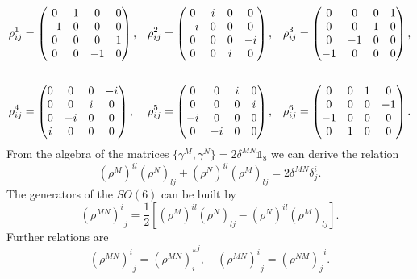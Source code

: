 \begin{align}
\rho^{1}_{ij} &= \begin{pmatrix}
0 & 1 & 0 & 0 \\ 
-1 & 0 & 0 & 0 \\ 
0 & 0 & 0 & 1 \\ 
0 & 0 & -1 & 0
\end{pmatrix} , &
%
\rho^{2}_{ij} &= \begin{pmatrix}
0 & i & 0 & 0 \\ 
-i & 0 & 0 & 0 \\ 
0 & 0 & 0 & -i \\ 
0 & 0 & i & 0
\end{pmatrix} , &
%
\rho^{3}_{ij} &= \begin{pmatrix}
0 & 0 & 0 & 1 \\ 
0 & 0 & 1 & 0 \\ 
0 & -1 & 0 & 0 \\ 
-1 & 0 & 0 & 0
\end{pmatrix} , \notag\\[0.6cm]
%
%
%
\rho^{4}_{ij} &= \begin{pmatrix}
0 & 0 & 0 & -i \\ 
0 & 0 & i & 0 \\ 
0 & -i & 0 & 0 \\ 
i & 0 & 0 & 0
\end{pmatrix} , &
%
\rho^{5}_{ij} &= \begin{pmatrix}
0 & 0 & i & 0 \\ 
0 & 0 & 0 & i \\ 
-i & 0 & 0 & 0 \\ 
0 & -i & 0 & 0
\end{pmatrix} , &
%
\rho^{6}_{ij} &= \begin{pmatrix}
0 & 0 & 1 & 0 \\ 
0 & 0 & 0 & -1 \\ 
-1 & 0 & 0 & 0 \\ 
0 & 1 & 0 & 0
\end{pmatrix} . \raisetag{-6pt}
\end{align}
%
%
From the  algebra of the  matrices $\lbrace \gamma^{M}, \gamma^{N}\rbrace = 2\delta^{MN}\mathds{1}_{8}$ we can derive the relation
%
%
\begin{equation}
(\rho^{M})^{il} (\rho^{N})_{lj} + (\rho^{N})^{il}(\rho^{M})_{lj} = 2\delta^{MN}\delta^{i}_{j}.
\end{equation}
%
%
The generators of the $SO(6)$ can be built by
%
%
\begin{equation}
{\left(\rho^{MN}\right)^{i}}_{j} = \frac{1}{2} \left[ \left(\rho^{M}\right)^{il} \left(\rho^{N}\right)_{lj} - \left(\rho^{N}\right)^{il} \left(\rho^{M}\right)_{lj} \right].
\end{equation}
%
%
Further relations are 
%
%
\begin{equation}
{\left(\rho^{MN}\right)^{i}}_{j} = {\left(\rho^{MN}\right)^{*}_{i}}^{j}, \quad {\left(\rho^{MN}\right)^{i}}_{j} = {\left(\rho^{NM}\right)_{j}}^{i}.
\end{equation}
%
%
%
%
%
%
%
